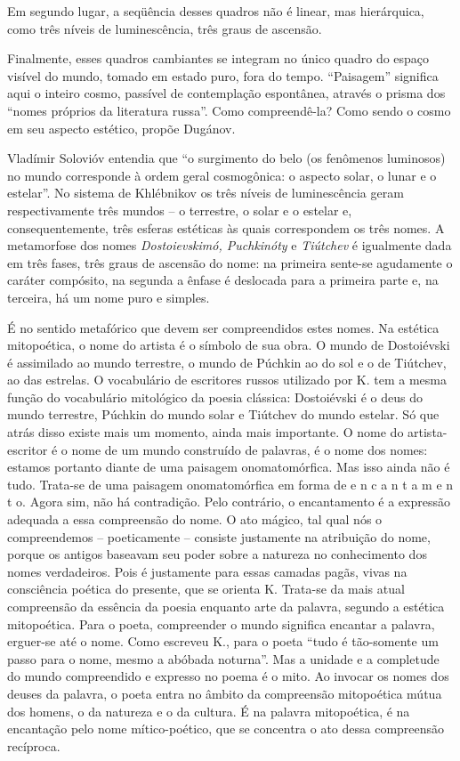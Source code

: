 Em segundo lugar, a seqüência desses quadros não é linear, mas
hierárquica, como três níveis de luminescência, três graus de ascensão.

Finalmente, esses quadros cambiantes se integram no único quadro do
espaço visível do mundo, tomado em estado puro, fora do tempo.
``Paisagem'' significa aqui o inteiro cosmo, passível de contemplação
espontânea, através o prisma dos ``nomes próprios da literatura russa''.
Como compreendê-la? Como sendo o cosmo em seu aspecto estético, propõe
Dugánov.

Vladímir Solovióv entendia que ``o surgimento do belo (os fenômenos
luminosos) no mundo corresponde à ordem geral cosmogônica: o aspecto
solar, o lunar e o estelar''. No sistema de Khlébnikov os três níveis de
luminescência geram respectivamente três mundos -- o terrestre, o solar
e o estelar e, consequentemente, três esferas estéticas às quais
correspondem os três nomes. A metamorfose dos nomes \emph{Dostoievskimó,
Puchkinóty} e \emph{Tiútchev} é igualmente dada em três fases, três
graus de ascensão do nome: na primeira sente-se agudamente o caráter
compósito, na segunda a ênfase é deslocada para a primeira parte e, na
terceira, há um nome puro e simples.

É no sentido metafórico que devem ser compreendidos estes nomes. Na
estética mitopoética, o nome do artista é o símbolo de sua obra. O mundo
de Dostoiévski é assimilado ao mundo terrestre, o mundo de Púchkin ao do
sol e o de Tiútchev, ao das estrelas. O vocabulário de escritores russos
utilizado por K. tem a mesma função do vocabulário mitológico da poesia
clássica: Dostoiévski é o deus do mundo terrestre, Púchkin do mundo
solar e Tiútchev do mundo estelar. Só que atrás disso existe mais um
momento, ainda mais importante. O nome do artista-escritor é o nome de
um mundo construído de palavras, é o nome dos nomes: estamos portanto
diante de uma paisagem onomatomórfica. Mas isso ainda não é tudo.
Trata-se de uma paisagem onomatomórfica em forma de e n c a n t a m e n
t o. Agora sim, não há contradição. Pelo contrário, o encantamento é a
expressão adequada a essa compreensão do nome. O ato mágico, tal qual
nós o compreendemos -- poeticamente -- consiste justamente na atribuição
do nome, porque os antigos baseavam seu poder sobre a natureza no
conhecimento dos nomes verdadeiros. Pois é justamente para essas camadas
pagãs, vivas na consciência poética do presente, que se orienta K.
Trata-se da mais atual compreensão da essência da poesia enquanto arte
da palavra, segundo a estética mitopoética. Para o poeta, compreender o
mundo significa encantar a palavra, erguer-se até o nome. Como escreveu
K., para o poeta ``tudo é tão-somente um passo para o nome, mesmo a
abóbada noturna''. Mas a unidade e a completude do mundo compreendido e
expresso no poema é o mito. Ao invocar os nomes dos deuses da palavra, o
poeta entra no âmbito da compreensão mitopoética mútua dos homens, o da
natureza e o da cultura. É na palavra mitopoética, é na encantação pelo
nome mítico-poético, que se concentra o ato dessa compreensão recíproca.

